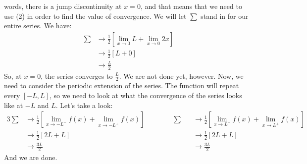 words, there is a jump discontinuity at $x = 0$, and that means that we need to
use (2) in order to find the value of convergence. We will let $\sum$ stand in
for our entire series. We have:
\begin{align*}
\sum &\to \frac{1}{2}\left[\lim_{x\to 0}L + \lim_{x\to0}2x\right]\\
&\to \frac{1}{2}[L + 0]\\
&\to \frac{L}{2}
\end{align*}
\noindent So, at $x=0$, the series converges to $\frac{L}{2}$. We are not done
yet, however. Now, we need to consider the periodic extension of the series. The
function will repeat every $[-L,L]$, so we need to look at what the convergence
of the series looks like at $-L$ and $L$. Let's take a look:
\begin{alignat*}{3}
\sum&\to\frac{1}{2}\left[\lim_{x\to-L^{-}}f(x) + \lim_{x\to-L^{+}}f(x)\right] \qquad\qquad \sum&&\to
\frac{1}{2}\left[\lim_{x\to L^{-}}f(x) + \lim_{x\to L^{+}}f(x)\right]\\
&\to \frac{1}{2}[2L + L] &&\to \frac{1}{2}[2L + L]\\
&\to\frac{3L}{2} &&\to\frac{3L}{2}
\end{alignat*}
\noindent And we are done.
